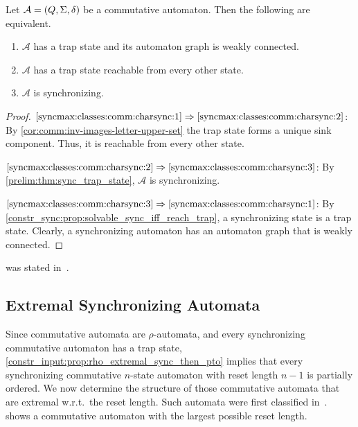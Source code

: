 \begin{proposition} \label{syncmax:classes:comm:charsync}	
	Let $\mathcal A = (Q, \Sigma, \delta)$ be a commutative automaton.
	Then the following are equivalent.
	\begin{enumerate}
		\item \label{syncmax:classes:comm:charsync:1} $\mathcal A$ has a trap state and its automaton graph is weakly connected.
		
		\item \label{syncmax:classes:comm:charsync:2} $\mathcal A$ has a trap state reachable from every other state.
		
		\item \label{syncmax:classes:comm:charsync:3} $\mathcal A$ is synchronizing.
	\end{enumerate}	
\end{proposition}
\begin{proof}
	$\ref{syncmax:classes:comm:charsync:1}\Rightarrow \ref{syncmax:classes:comm:charsync:2}$: By \cref{cor:comm:inv-images-letter-upper-set}
	the trap state forms a unique sink component.
	Thus, it is reachable from every other state.
	
	$\ref{syncmax:classes:comm:charsync:2}\Rightarrow \ref{syncmax:classes:comm:charsync:3}$: By \cref{prelim:thm:sync_trap_state}, $\mathcal A$
	is synchronizing.
	
	$\ref{syncmax:classes:comm:charsync:3}\Rightarrow \ref{syncmax:classes:comm:charsync:1}$: By \cref{constr_sync:prop:solvable_sync_iff_reach_trap},
	a synchronizing state is a trap state. Clearly, a synchronizing
	automaton has an automaton graph that is weakly connected.
\end{proof}

 was stated in~\cite[Lem.~5.1]{DBLP:conf/fun/FernauH022}.

\subsection{Extremal Synchronizing Automata}
\label{prelim:classes:comm:subsec:extremal}

Since commutative automata are $\rho$-automata, and every synchronizing commutative automaton has a trap state, \cref{constr_input:prop:rho_extremal_sync_then_pto} implies that every synchronizing commutative $n$-state automaton with reset length $n-1$ is partially ordered. We now determine the structure of those commutative automata that are extremal w.r.t.~the reset length. Such automata were first classified in~\cite[Thm.~23]{FernauHoffmann19}.  shows a commutative automaton with the largest possible reset length.

